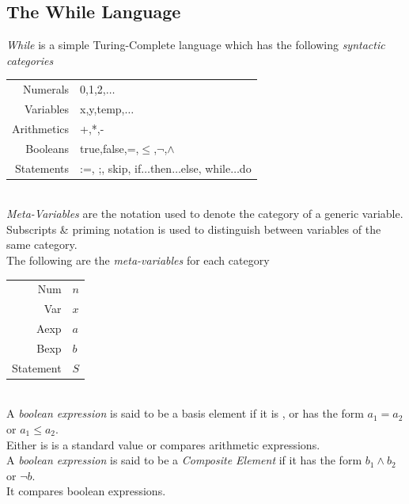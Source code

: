 \documentclass[11pt,a4paper]{article}
\begin{document}
\subsection{The While Language}

\textit{While} is a simple Turing-Complete language which has the following \textit{syntactic categories}\\
\begin{tabular}{rl}
Numerals&0,1,2,$\dots$\\
Variables&x,y,temp,$\dots$\\
Arithmetics&+,*,-\\
Booleans& true,false,=,$\leq$,$\neg$,$\wedge$\\
Statements& :=, ;, skip, if$\dots$then$\dots$else, while$\dots$do
\end{tabular}
\\

\textit{Meta-Variables} are the notation used to denote the category of a generic variable.\\
Subscripts \& priming notation is used to distinguish between variables of the same category.\\
The following are the \textit{meta-variables} for each category\\
\begin{tabular}{rl}
Num&$n$\\
Var&$x$\\
Aexp&$a$\\
Bexp&$b$\\
Statement&$S$
\end{tabular}
\\

A \textit{boolean expression} is said to be a basis element if it is {}, {} or has the form $a_1=a_2$ or $a_1\leq a_2$.\\
\nb Either is is a standard value or compares arithmetic expressions.\\

A \textit{boolean expression} is said to be a \textit{Composite Element} if it has the form $b_1\wedge b_2$ or $\neg b$.\\
\nb It compares boolean expressions.\\
\end{document}
